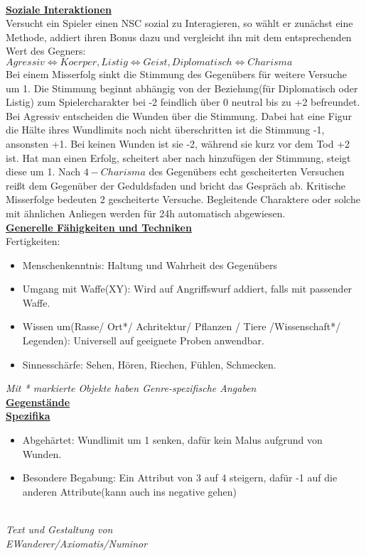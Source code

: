 \documentclass[twoside,a4paper]{minimal}
\begin{document}
\begin{multicols*}{3}
\textbf{\uline{\\Soziale Interaktionen}}
\\Versucht ein Spieler einen NSC sozial zu Interagieren, so wählt er zunächst eine Methode, addiert ihren Bonus dazu und vergleicht ihn mit dem entsprechenden Wert des Gegners:
\\$Agressiv\iff Koerper,Listig\iff Geist,Diplomatisch\iff Charisma$
\\Bei einem Misserfolg sinkt die Stimmung des Gegenübers für weitere Versuche um 1. Die Stimmung beginnt abhängig von der Beziehung(für Diplomatisch oder Listig) zum Spielercharakter bei -2 feindlich über 0 neutral bis zu +2 befreundet. Bei Agressiv entscheiden die Wunden über die Stimmung. Dabei hat eine Figur die Hälte ihres Wundlimits noch nicht überschritten ist die Stimmung -1, ansonsten +1. Bei keinen Wunden ist sie -2, während sie kurz vor dem Tod +2 ist. Hat man einen Erfolg, scheitert aber nach hinzufügen der Stimmung, steigt diese um 1. Nach $4-Charisma$ des Gegenübers echt gescheiterten Versuchen reißt dem Gegenüber der Geduldsfaden und bricht das Gespräch ab. Kritische Misserfolge bedeuten 2 gescheiterte Versuche. Begleitende Charaktere oder solche mit ähnlichen Anliegen werden für 24h automatisch abgewiesen.
\textbf{\uline{\\Generelle Fähigkeiten und Techniken}}
\\Fertigkeiten: 
\begin{itemize}
\item Menschenkenntnis: Haltung und Wahrheit des Gegenübers
\item Umgang mit Waffe(XY): Wird auf Angriffswurf addiert, falls mit passender Waffe.
\item Wissen um(Rasse/ Ort*/ Achritektur/ Pflanzen / Tiere /Wissenschaft*/ Legenden): Universell auf geeignete Proben anwendbar.
\item Sinnesschärfe: Sehen, Hören, Riechen, Fühlen, Schmecken.
\end{itemize}
\textit{Mit * markierte Objekte haben Genre-spezifische Angaben}
\textbf{\uline{\\Gegenstände}}
\textbf{\uline{\\Spezifika}}
\begin{itemize}
\item Abgehärtet: Wundlimit um 1 senken, dafür kein Malus aufgrund von Wunden.
\item Besondere Begabung: Ein Attribut von 3 auf 4 steigern, dafür -1 auf die anderen Attribute(kann auch ins negative gehen)
\end{itemize}
\textit{\\Text und Gestaltung von\\EWanderer/Axiomatis/Numinor}
\end{multicols*}
\end{document}
